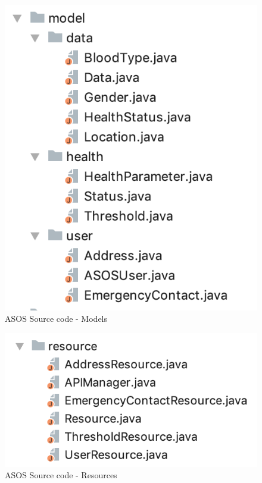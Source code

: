 \documentclass[a4paper, hidelinks, 12pt]{report}
\begin{document}
	\begin{figure}[H]
		\centering
		\includegraphics[scale=0.6]{images/backend/asos_source_code_models.png}
		\caption[ASOS Source code - Models]{ASOS Source code - Models}
		\label{fig:asos_source_code_models}
	\end{figure}

	\begin{figure}[H]
		\centering
		\includegraphics[scale=0.6]{images/backend/asos_source_code_resources.png}
		\caption[ASOS Source code - Resources]{ASOS Source code - Resources}
		\label{fig:asos_source_code_resources}
	\end{figure}
\end{document}
